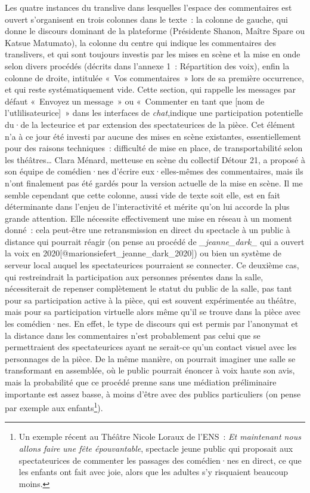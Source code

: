 \documentclass[
]{article}
\begin{document}
Les quatre instances du translive dans lesquelles l'espace des commentaires est ouvert s'organisent en trois colonnes dans le texte~: la colonne de gauche, qui donne le discours dominant de la plateforme (Présidente Shanon, Maître Spare ou Katsue Matumato), la colonne du centre qui indique les commentaires des translivers, et qui sont toujours investis par les mises en scène et la mise en onde selon divers procédés (décrits dans l'annexe 1~: Répartition des voix), enfin la colonne de droite, intitulée «~Vos commentaires~» lors de sa première occurrence, et qui reste systématiquement vide. Cette section, qui rappelle les messages par défaut «~Envoyez un message~» ou «~Commenter en tant que {[}nom de l'utlilisateurice{]}~» dans les interfaces de \emph{chat},indique une participation potentielle du·de la lecteurice et par extension des spectateurices de la pièce. Cet élément n'a à ce jour été investi par aucune des mises en scène existantes, essentiellement pour des raisons techniques~: difficulté de mise en place, de transportabilité selon les théâtres\ldots{} Clara Ménard, metteuse en scène du collectif Détour 21, a proposé à son équipe de comédien·nes d'écrire eux·elles-mêmes des commentaires, mais ils n'ont finalement pas été gardés pour la version actuelle de la mise en scène. Il me semble cependant que cette colonne, aussi vide de texte soit elle, est en fait déterminante dans l'enjeu de l'interactivité et mérite qu'on lui accorde la plus grande attention. Elle nécessite effectivement une mise en réseau à un moment donné~: cela peut-être une retransmission en direct du spectacle à un public à distance qui pourrait réagir (on pense au procédé de \emph{\_jeanne\_dark\_} qui a ouvert la voix en 2020{[}@marionsiefert\_jeanne\_dark\_2020{]}) ou bien un système de serveur local auquel les spectateurices pourraient se connecter. Ce deuxième cas, qui restreindrait la participation aux personnes présentes dans la salle, nécessiterait de repenser complètement le statut du public de la salle, pas tant pour sa participation active à la pièce, qui est souvent expérimentée au théâtre, mais pour sa participation virtuelle alors même qu'il se trouve dans la pièce avec les comédien·nes. En effet, le type de discours qui est permis par l'anonymat et la distance dans les commentaires n'est probablement pas celui que se permettraient des spectateurices ayant ne serait-ce qu'un contact visuel avec les personnages de la pièce. De la même manière, on pourrait imaginer une salle se transformant en assemblée, où le public pourrait énoncer à voix haute son avis, mais la probabilité que ce procédé prenne sans une médiation préliminaire importante est assez basse, à moins d'être avec des publics particuliers (on pense par exemple aux enfants\footnote{Un exemple récent au Théâtre Nicole Loraux de l'ENS~: \emph{Et maintenant nous allons faire une fête épouvantable}, spectacle jeune public qui proposait aux spectateurices de commenter les passages des comédien·nes en direct, ce que les enfants ont fait avec joie, alors que les adultes s'y risquaient beaucoup moins.}).
\end{document}
